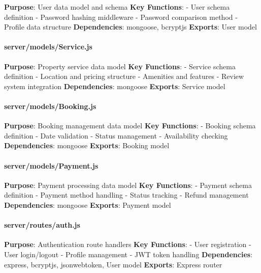 \documentclass[12pt,a4paper]{article}
\begin{document}
\textbf{Purpose}: User data model and schema \textbf{Key Functions}: -
User schema definition - Password hashing middleware - Password
comparison method - Profile data structure \textbf{Dependencies}:
mongoose, bcryptjs \textbf{Exports}: User model

\hypertarget{servermodelsservice.js}{%
\paragraph{server/models/Service.js}\label{servermodelsservice.js}}

\textbf{Purpose}: Property service data model \textbf{Key Functions}: -
Service schema definition - Location and pricing structure - Amenities
and features - Review system integration \textbf{Dependencies}: mongoose
\textbf{Exports}: Service model

\hypertarget{servermodelsbooking.js}{%
\paragraph{server/models/Booking.js}\label{servermodelsbooking.js}}

\textbf{Purpose}: Booking management data model \textbf{Key Functions}:
- Booking schema definition - Date validation - Status management -
Availability checking \textbf{Dependencies}: mongoose \textbf{Exports}:
Booking model

\hypertarget{servermodelspayment.js}{%
\paragraph{server/models/Payment.js}\label{servermodelspayment.js}}

\textbf{Purpose}: Payment processing data model \textbf{Key Functions}:
- Payment schema definition - Payment method handling - Status tracking
- Refund management \textbf{Dependencies}: mongoose \textbf{Exports}:
Payment model

\hypertarget{serverroutesauth.js}{%
\paragraph{server/routes/auth.js}\label{serverroutesauth.js}}

\textbf{Purpose}: Authentication route handlers \textbf{Key Functions}:
- User registration - User login/logout - Profile management - JWT token
handling \textbf{Dependencies}: express, bcryptjs, jsonwebtoken, User
model \textbf{Exports}: Express router
\end{document}
